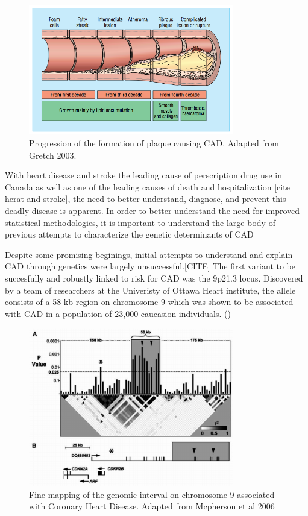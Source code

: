 \begin{figure}[h]
\caption{Progression of the formation of plaque causing \ac{CAD}. Adapted from Gretch 2003.}
\centering
\includegraphics[width=0.8\textwidth]{Figures/cad.png}
\end{figure}

With heart disease and stroke the leading cause of perscription drug use in Canada as well as one of the leading causes of death and hospitalization [cite herat and stroke], the need to better understand, diagnose, and prevent this deadly disease is apparent.  In order to better understand the need for improved statistical methodologies, it is important to understand the large body of previous attempts to characterize the genetic determinants of \ac{CAD}

Despite some promising beginings, initial attempts to understand and explain \ac{CAD} through genetics were largely unsuccessful.[CITE] The first variant to be succesfully and robustly linked to risk for \ac{CAD} was the 9p21.3 locus. Discovered by a team of researchers at the Univeristy of Ottawa Heart institute, the allele consists of a 58 \ac{kb} region on chromosome 9 which was shown to be associated with \ac{CAD} in a population of 23,000 caucasion individuals. (\cite{McPherson2016})

\begin{figure}[h]
\caption{Fine mapping of the genomic interval on chromosome 9 associated with Coronary Heart Disease. Adapted from Mcpherson et al 2006}
\centering
\includegraphics[width=0.8\textwidth]{Figures/9p21.png}
\end{figure}

